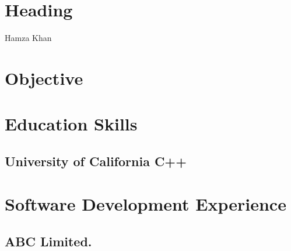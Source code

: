 \documentclass{cv}
\begin{document}
\section{Heading}
Hamza Khan



\section{Objective}


\section{Education      \hfill{Skills}}
\subsection{University of California \hfill{C++}}


\section{Software Development Experience}
\subsection{ABC Limited.}


\end{document}
